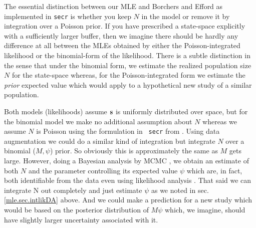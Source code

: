 The essential distinction between our MLE and Borchers and Efford
as implemented in \mbox{\tt secr}
is whether you keep $N$ in the model or remove it by
integration over a Poisson prior. If you have prescribed a state-space
explicitly with a sufficiently larger buffer, then we imagine there
should be hardly any difference at all between the MLEs obtained by
either the Poisson-integrated likelihood or the binomial-form of the likelihood.
There is a subtle distinction in the sense that under the binomial
form, we estimate the realized population size $N$ for the state-space
whereas, for the Poisson-integrated form we estimate the {\it prior} 
expected value which would apply to a hypothetical new study of a
similar population.


Both models (likelihoods) assume ${\bf s}$ is uniformly distributed over space, but
for the binomial model we  make no additional assumption about $N$
whereas we assume $N$ is Poisson using the formulation in \mbox{\tt
  secr} from 
\citep{borchers_efford:2008}.
Using data augmentation we could do a similar kind of integration but 
integrate $N$ over a binomial ($M,\psi$) prior. So obviously this is
approximately the same as $M$ gets large. However, doing a Bayesian
analysis by MCMC ,  we obtain an
estimate of both $N$ and the parameter controlling its expected value
$\psi$ which are, in fact, both identifiable from the data even using
likelihood analysis \citep{royle_etal:2007}.   That said we can integrate N
out completely and just estimate $\psi$ as we noted in sec.
\ref{mle.sec.intlikDA} above.
And we could make a prediction for a new study which would be based on
the posterior distribution of $M \psi$ which, we imagine, should have
slightly larger uncertainty associated with it. 






\begin{comment}
\subsection{Analysis of Efford's Possum Data}

Demonstrates an explicit model misspecification.
Or maybe -- likelihood easy to apply to multinomial likelihood from
previous chapter which is probably what secr does (checking with efford)

Use the mask he provides (show picture)
Use rectangular mask.

Cite above material on state-space grid. Use our likelihood function
with his state-space grid.

Need to focus on a specific illustration here. I think using
secr to fit the basic model using the state-space grid or no
state-space
grid, and using our likelihood function, would be fine.
Thats 4 estimates. 

Secr + grid
secr + no grid -- really a fine grid I think 
my likelihood + secr grid
my likelihood + really fine grid

Note: should not compare AIC across analysis platforms because the
likelihoods can be scaled arbitrarily -- depending on what to leave in
or leave out.
\end{comment}


